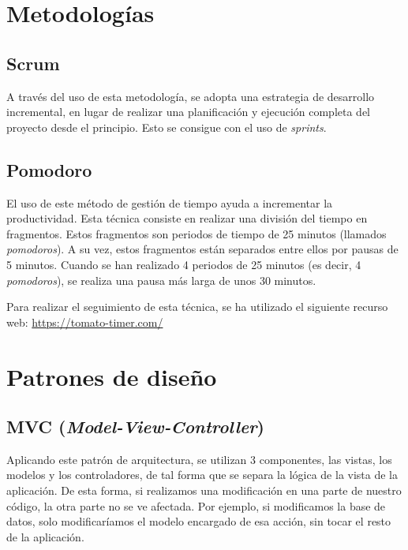 
\section{Metodologías}\label{metodologias}


\subsection{Scrum}\label{scrum}

A través del uso de esta metodología, se adopta una estrategia de desarrollo incremental, en lugar de realizar una planificación y ejecución completa del proyecto desde el principio. Esto se consigue con el uso de \emph{sprints}.

\subsection{Pomodoro}\label{pomodoro}

El uso de este método de gestión de tiempo ayuda a incrementar la productividad. Esta técnica consiste en realizar una división del tiempo en fragmentos. Estos fragmentos son periodos de tiempo de 25 minutos (llamados \emph{pomodoros}). A su vez, estos fragmentos están separados entre ellos por pausas de 5 minutos. Cuando se han realizado 4 periodos de 25 minutos (es decir, 4 \emph{pomodoros}), se realiza una pausa más larga de unos 30 minutos.

Para realizar el seguimiento de esta técnica, se ha utilizado el siguiente recurso web: \href{https://tomato-timer.com/}{https://tomato-timer.com/}

\section{Patrones de diseño}\label{patrones_de_diseño}

\subsection{MVC (\emph{Model-View-Controller})}\label{mode-view-conroller}

Aplicando este patrón de arquitectura, se utilizan 3 componentes, las vistas, los modelos y los controladores, de tal forma que se separa la lógica de la vista de la aplicación. De esta forma, si realizamos una modificación en una parte de nuestro código, la otra parte no se ve afectada. Por ejemplo, si modificamos la base de datos, solo modificaríamos el modelo encargado de esa acción, sin tocar el resto de la aplicación.

